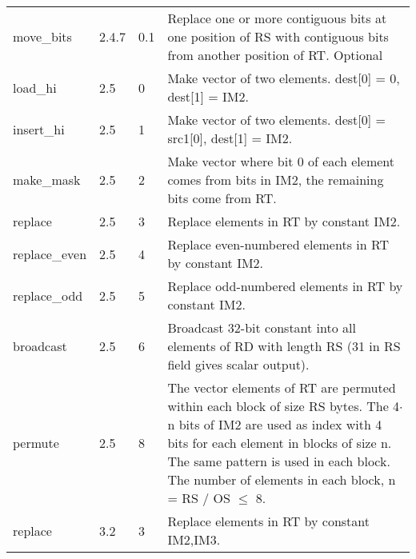 \documentclass[forwardcom.tex]{subfiles}
\begin{document}
\begin{longtable} {|p{20mm}|p{10mm}|p{8mm}|p{75mm}|}
move\_bits    & 2.4.7 & 0.1 & Replace one or more contiguous bits at one position of RS with contiguous bits from another position of RT. Optional \\

load\_hi      & 2.5 & 0 & Make vector of two elements. dest[0] = 0, dest[1] = IM2. \\
insert\_hi    & 2.5 & 1 & Make vector of two elements. dest[0] = src1[0], dest[1] = IM2. \\
make\_mask    & 2.5 & 2 & Make vector where bit 0 of each element comes from bits in IM2, the remaining bits come from RT. \\
replace       & 2.5 & 3 & Replace elements in RT by constant IM2. \\
replace\_even & 2.5 & 4 & Replace even-numbered elements in RT by constant
IM2. \\
replace\_odd  & 2.5 & 5 & Replace odd-numbered elements in RT by constant
IM2. \\
broadcast     & 2.5 & 6 & Broadcast 32-bit constant into all elements of RD with length RS (31 in RS field gives scalar output). \\
permute       & 2.5 & 8 & The vector elements of RT are permuted within each block of size RS bytes. The 4$\cdot$n bits of IM2 are used as index with 4 bits for
each element in blocks of size n. The same pattern is used in each
block. The number of elements in each block, n = RS / OS $\leq$ 8. \\
replace       & 3.2 & 3 & Replace elements in RT by constant IM2,IM3. \\
\hline
\end{longtable}
\end{document}
